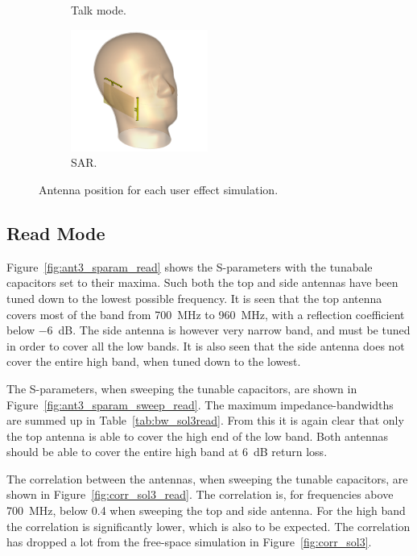 \begin{figure}[htbp]
\begin{subfigure}[b]{0.24\linewidth}
        \caption{Talk mode.}
    \end{subfigure}
    \begin{subfigure}[b]{0.24\linewidth}
        \centering
        \includegraphics[width=\linewidth,height=4cm,keepaspectratio]{img/tech_sol/nonresonant/simulation/sar/3d}
        \caption{SAR.}
    \end{subfigure}
    \caption{Antenna position for each user effect simulation.}
    \label{fig:ant3_positions}
\end{figure}

\FloatBarrier
\subsection{Read Mode}
Figure~\ref{fig:ant3_sparam_read} shows the S-parameters with the tunabale capacitors set to their maxima. Such both the top and side antennas have been tuned down to the lowest possible frequency. It is seen that the top antenna covers most of the band from \SI{700}{MHz} to \SI{960}{MHz}, with a reflection coefficient below \SI{-6}{dB}. The side antenna is however very narrow band, and must be tuned in order to cover all the low bands. It is also seen that the side antenna does not cover the entire high band, when tuned down to the lowest. 

The S-parameters, when sweeping the tunable capacitors, are shown in Figure~\ref{fig:ant3_sparam_sweep_read}. The maximum impedance-bandwidths are summed up in Table~\ref{tab:bw_sol3read}. From this it is again clear that only the top antenna is able to cover the high end of the low band. Both antennas should be able to cover the entire high band at \SI{6}{dB} return loss.

The correlation between the antennas, when sweeping the tunable capacitors, are shown in Figure~\ref{fig:corr_sol3_read}. The correlation is, for frequencies above \SI{700}{MHz}, below 0.4 when sweeping the top and side antenna. For the high band the correlation is significantly lower, which is also to be expected. The correlation has dropped a lot from the free-space simulation in Figure~\ref{fig:corr_sol3}.

